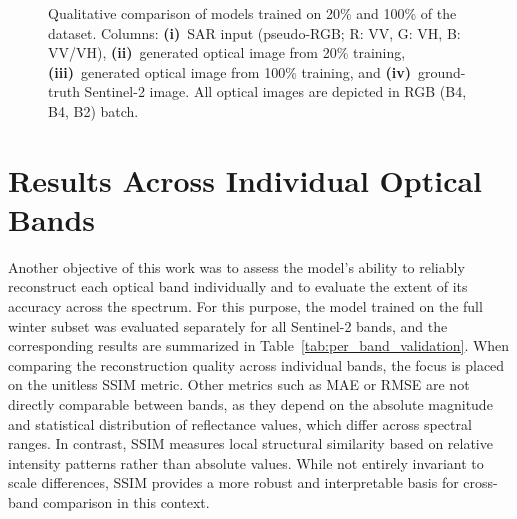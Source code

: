 \begin{figure}[!htbp]
    \caption[Qualitative results for different training data scales: 20\% \& 100\%]{%
    Qualitative comparison of models trained on 20\% and 100\% of the dataset. 
    Columns: \textbf{(i)}~SAR input (pseudo-RGB; R: VV, G: VH, B: VV/VH), 
    \textbf{(ii)}~generated optical image from 20\% training, 
    \textbf{(iii)}~generated optical image from 100\% training, and 
    \textbf{(iv)}~ground-truth Sentinel-2 image. All optical images are depicted in RGB (B4, B4, B2) batch.}
    \label{fig:qualitative_results_100_20}
\end{figure}
\clearpage
\section{Results Across Individual Optical Bands}
Another objective of this work was to assess the model’s ability to reliably reconstruct each optical band individually and to evaluate the extent of its accuracy across the spectrum. 
For this purpose, the model trained on the full winter subset was evaluated separately for all Sentinel-2 bands, and the corresponding results are summarized in Table~\ref{tab:per_band_validation}.
When comparing the reconstruction quality across individual bands, the focus is placed on the unitless SSIM metric. Other metrics such as MAE or RMSE are not directly comparable between bands, as they depend on the absolute magnitude and statistical distribution of reflectance values, which differ across spectral ranges. In contrast, SSIM measures local structural similarity based on relative intensity patterns rather than absolute values. While not entirely invariant to scale differences, SSIM provides a more robust and interpretable basis for cross-band comparison in this context.

